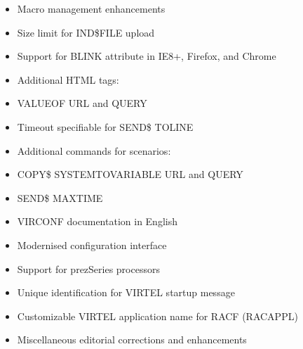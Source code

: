 \documentclass[letterpaper,10pt,english]{sphinxmanual}
\begin{document}
\sphinxAtStartPar
{}
\begin{itemize}
\item {} 
\sphinxAtStartPar
Macro management enhancements

\item {} 
\sphinxAtStartPar
Size limit for IND\$FILE upload

\item {} 
\sphinxAtStartPar
Support for BLINK attribute in IE8+, Firefox, and Chrome

\item {} 
\sphinxAtStartPar
Additional HTML tags:

\item {} 
\sphinxAtStartPar
VALUE\sphinxhyphen{}OF URL and QUERY

\end{itemize}

\sphinxAtStartPar
{}
\begin{itemize}
\item {} 
\sphinxAtStartPar
Timeout specifiable for SEND\$ TO\sphinxhyphen{}LINE

\item {} 
\sphinxAtStartPar
Additional commands for scenarios:

\item {} 
\sphinxAtStartPar
COPY\$ SYSTEM\sphinxhyphen{}TO\sphinxhyphen{}VARIABLE URL and QUERY

\item {} 
\sphinxAtStartPar
SEND\$ MAXTIME

\end{itemize}

\sphinxAtStartPar
{}
\begin{itemize}
\item {} 
\sphinxAtStartPar
VIRCONF documentation in English

\item {} 
\sphinxAtStartPar
Modernised configuration interface

\item {} 
\sphinxAtStartPar
Support for pre\sphinxhyphen{}zSeries processors

\item {} 
\sphinxAtStartPar
Unique identification for VIRTEL startup message

\item {} 
\sphinxAtStartPar
Customizable VIRTEL application name for RACF (RACAPPL)

\item {} 
\sphinxAtStartPar
Miscellaneous editorial corrections and enhancements

\end{itemize}
\end{document}
